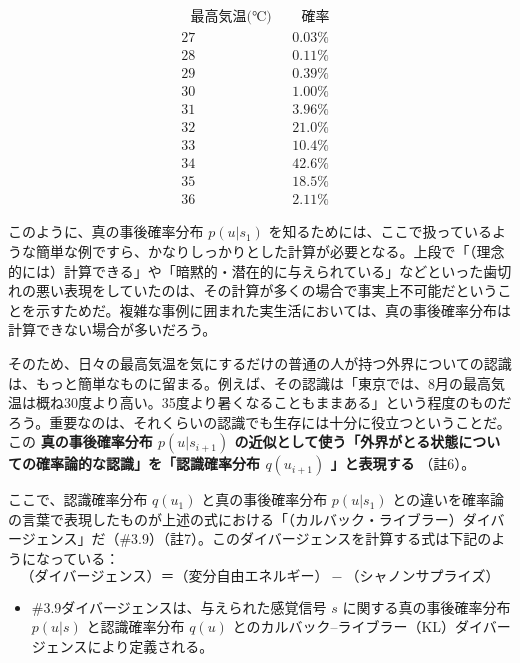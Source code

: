 \[
\begin{array}{cc}
~~~\textrm{最高気温(℃)}~~~ & ~~~\textrm{確率}~~~ \\
\hline
\textrm{27} & \textrm{0.03\%} \\
\textrm{28} & \textrm{0.11\%} \\
\textrm{29} & \textrm{0.39\%} \\
\textrm{30} & \textrm{1.00\%} \\
\textrm{31} & \textrm{3.96\%} \\
\textrm{32} & \textrm{21.0\%} \\
\textrm{33} & \textrm{10.4\%} \\
\textrm{34} & \textrm{42.6\%} \\
\textrm{35} & \textrm{18.5\%} \\
\textrm{36} & \textrm{2.11\%}
\end{array}
\tag{表4}
\]

このように、真の事後確率分布 \(p(u|s_1)\)
を知るためには、ここで扱っているような簡単な例ですら、かなりしっかりとした計算が必要となる。上段で「（理念的には）計算できる」や「暗黙的・潜在的に与えられている」などといった歯切れの悪い表現をしていたのは、その計算が多くの場合で事実上不可能だということを示すためだ。複雑な事例に囲まれた実生活においては、真の事後確率分布は計算できない場合が多いだろう。

そのため、日々の最高気温を気にするだけの普通の人が持つ外界についての認識は、もっと簡単なものに留まる。例えば、その認識は「東京では、8月の最高気温は概ね30度より高い。35度より暑くなることもままある」という程度のものだろう。重要なのは、それくらいの認識でも生存には十分に役立つということだ。この
\textbf{真の事後確率分布 \(p(u|s_{i+1})\)
の近似として使う「外界がとる状態についての確率論的な認識」を「認識確率分布
\(q(u_{i+1})\) 」と表現する} （註6）。

ここで、認識確率分布 \(q(u_1)\) と真の事後確率分布 \(p(u|s_1)\)
との違いを確率論の言葉で表現したものが上述の式における「（カルバック・ライブラー）ダイバージェンス」だ（\#3.9）（註7）。このダイバージェンスを計算する式は下記のようになっている：
\[
（ダイバージェンス）＝（変分自由エネルギー）-（シャノンサプライズ）\tag{2}
\]

\begin{note}{}
  \begin{itemize}
    \tightlist
    \item{\#3.9}ダイバージェンスは、与えられた感覚信号 $s$ に関する真の事後確率分布 $p(u|s)$ と認識確率分布 $q(u)$ とのカルバック–ライブラー（KL）ダイバージェンスにより定義される。
  \end{itemize}
\end{note}

